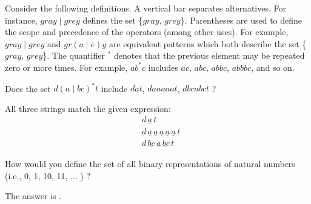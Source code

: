 \documentclass{ximera}
\begin{document}
\begin{question}
Consider the following definitions.  
A vertical bar separates alternatives. For instance, $gray  \mid grey$ defines the set \{$gray$, $grey$\}.
Parentheses are used to define the scope and precedence of the operators (among other uses). For example, $gray \mid grey$ and $gr(a\mid e)y$ are equivalent patterns which both describe the set 
 \{$gray$, $grey$\}.
The quantifier $^*$ denotes that the previous element may be repeated zero or more times. 
 For example, $ab^*c$ includes $ac$, $abc$, $abbc$, $abbbc$, and so on.

Does the set $d (a \mid bc)^*t  $ include $dat$, $daaaaat$, $dbcabct$ ?  

\begin{solution}
\begin{multiple-choice}
\end{multiple-choice}
\end{solution}
 
All three strings match the given expression:
\begin{align*}
&d \, \underline{a} \, t\\
&d \, \underline{a} \, \underline{a} \, \underline{a} \, \underline{a} \, \underline{a} \, t\\
&d \, \underline{bc} \, \underline{a} \, \underline{bc} \, t
\end{align*}

How would you define the set of all binary representations of natural numbers (i.e., 0, 1, 10, 11, ... ) ?

\begin{solution}
The answer is .
\end{solution}
\end{question}
\end{document}
